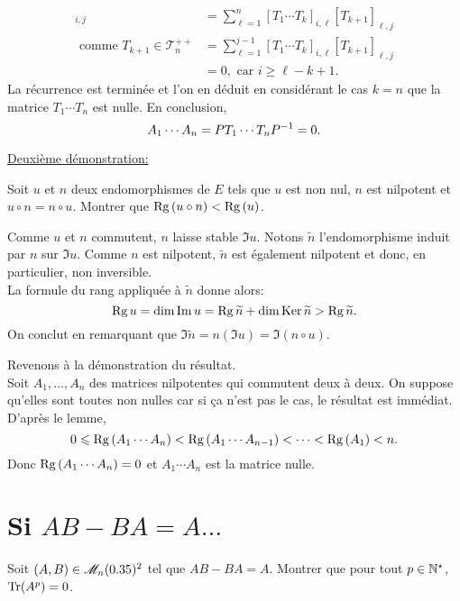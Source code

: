 \begin{solution}
\begin{enumerate}
\begin{itemize}
\begin{align*}
                [T_1 \cdots T_{k+1}]_{i,j} &= \sum_{\ell=1}^n [T_1 \cdots T_k]_{i, \ell} [T_{k+1}]_{\ell, j} \\
                \text{ comme } T_{k+1} \in \mathscr{T}_n^{++} &= \sum_{\ell=1}^{j-1} [T_1 \cdots T_k]_{i, \ell} [T_{k+1}]_{\ell, j} \\
                &= 0, \text{ car } i \geqslant \ell - k +1.
            \end{align*}
            La récurrence est terminée et l'on en déduit en considérant le cas $k = n$ que la matrice $T_1 \cdots T_n$ est nulle. En conclusion,
            $$A_1 \cdots A_n = P T_1 \cdots T_n P^{-1} = 0.$$
        \end{itemize}
        \underline{Deuxième démonstration:} \\
        \begin{lemme}
            Soit $u$ et $n$ deux endomorphismes de $E$ tels que $u$ est non nul, $n$ est nilpotent et $u \circ n = n \circ u$. Montrer que $\mathrm{Rg}\,(u \circ n) < \mathrm{Rg}\,(u)$.
        \end{lemme}
        \begin{preuve}
            Comme $u$ et $n$ commutent, $n$ laisse stable $\Im u$. Notons $\widetilde{n}$ l'endomorphisme induit par $n$ sur $\Im u$. Comme $n$ est nilpotent, $\widetilde{n}$ est également nilpotent et donc, en particulier, non inversible. \\
            La formule du rang appliquée à $\widetilde{n}$ donne alors:
            $$\mathrm{Rg}\, u = \dim \Im u = \mathrm{Rg}\, \widetilde{n} + \dim \mathrm{Ker}\, \widetilde{n} > \mathrm{Rg}\, \widetilde{n}.$$
            On conclut en remarquant que $\Im \widetilde{n} = n(\Im u) = \Im (n \circ u)$.
        \end{preuve}
    \end{enumerate}
    Revenons à la démonstration du résultat. \\
    Soit $A_1, \dots, A_n$ des matrices nilpotentes qui commutent deux à deux. On suppose qu'elles sont toutes non nulles car si ça n'est pas le cas, le résultat est immédiat. \\
    D'après le lemme,
    $$0 \leqslant \mathrm{Rg}\,(A_1 \cdots A_n) < \mathrm{Rg}\,(A_1 \cdots A_{n-1}) < \cdots < \mathrm{Rg}\,(A_1) < n.$$
    Donc $\mathrm{Rg}\,(A_1 \cdots A_n) = 0$ et $A_1 \cdots A_n$ est la matrice nulle.
\end{solution}


\section{Si \texorpdfstring{$AB - BA = A \dots$}{AB-BA=A...}}
\begin{exercice}
    Soit $(A, B) \in \mathscr{M}_n(0.35)^2$ tel que $AB-BA=A$. Montrer que pour tout $p \in \mathbb{N}^\star$, $\mathrm{Tr}(A^p) = 0$.
\end{exercice}

